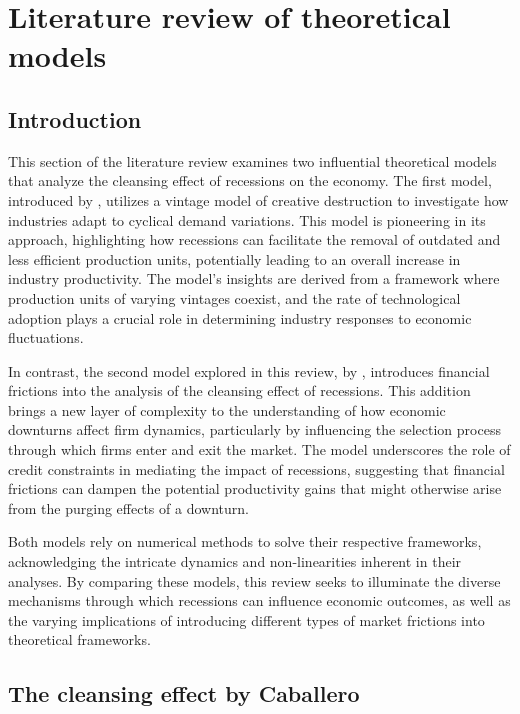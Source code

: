\documentclass[12pt]{report}
\begin{document}
\section{Literature review of theoretical models}
\subsection{Introduction}
This section of the literature review examines two influential theoretical models that analyze the cleansing effect of
recessions on the economy. The first model, introduced by \cite{CabHarm94}, utilizes a vintage model of
creative destruction to investigate how industries adapt to cyclical demand variations. This model is pioneering in its
approach, highlighting how recessions can facilitate the removal of outdated and less efficient production units,
potentially leading to an overall increase in industry productivity. The model's insights are derived from a framework
where production units of varying vintages coexist, and the rate of technological adoption plays a crucial role in
determining industry responses to economic fluctuations.

In contrast, the second model explored in this review, by \cite{OsePap17}, introduces financial frictions into
the analysis of the cleansing effect of recessions. This addition brings a new layer of complexity to the understanding
of how economic downturns affect firm dynamics, particularly by influencing the selection process through which firms
enter and exit the market. The model underscores the role of credit constraints in mediating the impact of recessions,
suggesting that financial frictions can dampen the potential productivity gains that might otherwise arise from the
purging effects of a downturn.

Both models rely on numerical methods to solve their respective frameworks, acknowledging the intricate dynamics and
non-linearities inherent in their analyses. By comparing these models, this review seeks to illuminate the diverse
mechanisms through which recessions can influence economic outcomes, as well as the varying implications of introducing
different types of market frictions into theoretical frameworks.
\subsection{The cleansing effect by Caballero}
\end{document}
